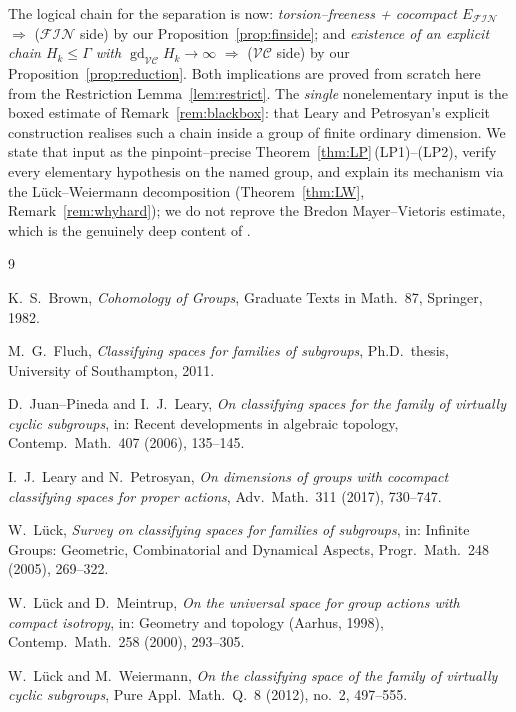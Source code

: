 \documentclass{amsart}
\theoremstyle{definition}
\newcommand{\FIN}{\mathcal{F\!I\!N}}
\newcommand{\VC}{\mathcal{V\!C}}
\newcommand{\gd}{\operatorname{gd}}
\begin{document}
The logical chain for the separation is now: \emph{torsion--freeness + cocompact $E_{\FIN}$}
$\Rightarrow$ ($\FIN$ side) by our Proposition~\ref{prop:finside}; and \emph{existence of an
explicit chain $H_k\le\Gamma$ with $\gd_{\VC}H_k\to\infty$} $\Rightarrow$ ($\VC$ side) by our
Proposition~\ref{prop:reduction}. Both implications are proved from scratch here from the
Restriction Lemma~\ref{lem:restrict}. The \emph{single} nonelementary input is the boxed
estimate of Remark~\ref{rem:blackbox}: that Leary and Petrosyan's explicit construction
realises such a chain inside a group of finite ordinary dimension. We state that input as the
pinpoint--precise Theorem~\ref{thm:LP}\,(LP1)--(LP2), verify every elementary hypothesis on the
named group, and explain its mechanism via the Lück--Weiermann decomposition
(Theorem~\ref{thm:LW}, Remark~\ref{rem:whyhard}); we do not reprove the Bredon
Mayer--Vietoris estimate, which is the genuinely deep content of \cite{LearyPetrosyan}.

\begin{thebibliography}{9}

 K.~S.~Brown, \emph{Cohomology of Groups}, Graduate Texts in Math.\ 87,
Springer, 1982.

 M.~G.~Fluch, \emph{Classifying spaces for families of subgroups},
Ph.D.\ thesis, University of Southampton, 2011.

 D.~Juan--Pineda and I.~J.~Leary,
\emph{On classifying spaces for the family of virtually cyclic subgroups},
in: Recent developments in algebraic topology, Contemp.\ Math.\ 407 (2006), 135--145.

 I.~J.~Leary and N.~Petrosyan,
\emph{On dimensions of groups with cocompact classifying spaces for proper actions},
Adv.\ Math.\ 311 (2017), 730--747.

 W.~Lück,
\emph{Survey on classifying spaces for families of subgroups},
in: Infinite Groups: Geometric, Combinatorial and Dynamical Aspects,
Progr.\ Math.\ 248 (2005), 269--322.

 W.~Lück and D.~Meintrup,
\emph{On the universal space for group actions with compact isotropy},
in: Geometry and topology (Aarhus, 1998), Contemp.\ Math.\ 258 (2000), 293--305.

 W.~Lück and M.~Weiermann,
\emph{On the classifying space of the family of virtually cyclic subgroups},
Pure Appl.\ Math.\ Q.\ 8 (2012), no.~2, 497--555.

\end{thebibliography}
\end{document}
